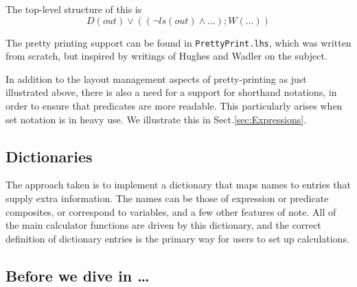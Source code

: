 \noindent
The top-level structure of this is
\[D(out) \lor ( (\lnot ls(out) \land \dots) ; W(\dots) )\]

\noindent
The pretty printing support can be found in \texttt{PrettyPrint.lhs},
which was written from scratch, but inspired by writings of
Hughes\cite{HughesJohn1995c} and Wadler\cite{wadler-pp}
on the subject.

In addition to the layout management aspects of pretty-printing
as just illustrated above,
there is also a need for a support for shorthand notations,
in order to ensure that predicates are more readable.
This particularly arises when set notation is in heavy use.
We illustrate this in Sect.\ref{sec:Expressions}.

\subsection{Dictionaries}\label{ssec:dict}

The approach taken is to implement a dictionary that maps names
to entries that supply extra information.
The names can be those of expression or predicate composites,
or correspond to variables, and a few other features of note.
All of the main calculator functions are driven by this
dictionary,
and the correct definition of dictionary entries
is the primary way for users to set up calculations.

%





\subsection{Before we dive in \dots}

